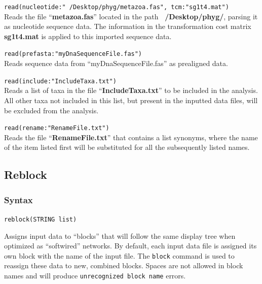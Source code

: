 	\begin{example}
		\item{\texttt{read(nucleotide:"~/Desktop/phyg/metazoa.fas", tcm:"sg1t4.mat")}\\ Reads the
		file ``\textbf{metazoa.fas}'' located in the path \textbf{~/Desktop/phyg/}, parsing it as 
		nucleotide sequence data. The information in the transformation cost matrix 
		\textbf{sg1t4.mat} is applied to this imported sequence data.}
		
		\item{\texttt{read(prefasta:"myDnaSequenceFile.fas")}\\ Reads sequence data from 
		``myDnaSequenceFile.fas'' as prealigned data.}
		
		\item{\texttt{read(include:"IncludeTaxa.txt")}\\ Reads a list of taxa in the file 
		``\textbf{IncludeTaxa.txt}'' to be included in the analysis. All other taxa not included 
		in this list, but present in the inputted data files, will be excluded from the analysis.}
		
		\item{\texttt{read(rename:"RenameFile.txt")}\\ Reads the file ``\textbf{RenameFile.txt}'' 
		that contains a list synonyms, where the name of the item listed first will be substituted 
		for all the subsequently listed names. }
	\end{example}
		
\subsection{Reblock}
\label{subsec:reblock}
	\subsubsection{Syntax}
		\texttt{reblock(STRING list)}
	
	\begin{phygdescription}
		{Assigns input data to ``blocks'' that will follow the same display tree when optimized
		as ``softwired'' networks. By default, each input data file is assigned its own block with 
		the name of the input file. The \texttt{block} command is used to reassign these data to 
		new, combined blocks. Spaces are not allowed in block names and will produce 
		\texttt{unrecognized block name} errors.} 
	\end{phygdescription}
	
